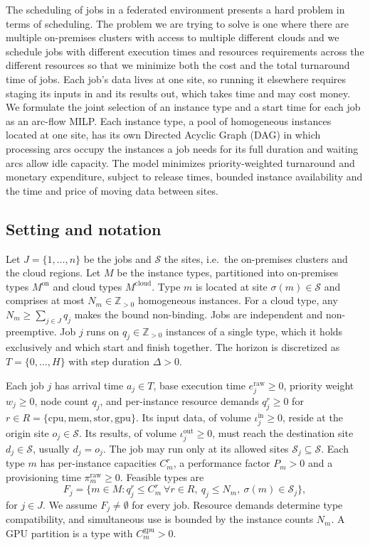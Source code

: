 \documentclass[conference]{IEEEtran}
\begin{document}
The scheduling of jobs in a federated environment presents a hard problem in terms of scheduling. The problem we are trying to solve is one where there are multiple on-premises clusters with access to multiple different clouds and we schedule jobs with different execution times and resources requirements  across the different resources so that we minimize both the cost and the total turnaround time of jobs. Each job's data lives at one site, so running it elsewhere requires staging its inputs in and its results out, which takes time and may cost money. We formulate the joint selection of an instance type and a start time for each job as an arc-flow MILP. Each instance type, a pool of homogeneous instances located at one site, has its own Directed Acyclic Graph (DAG) in which processing arcs occupy the instances a job needs for its full duration and waiting arcs allow idle capacity. The model minimizes priority-weighted turnaround and monetary expenditure, subject to release times, bounded instance availability and the time and price of moving data between sites.

\subsection{Setting and notation}

Let $J=\{1,\ldots,n\}$ be the jobs and $\mathcal{S}$ the sites, i.e.\ the on-premises clusters and the cloud regions. Let $M$ be the instance types, partitioned into on-premises types $M^{\mathrm{on}}$ and cloud types $M^{\mathrm{cloud}}$. Type $m$ is located at site $\sigma(m)\in\mathcal{S}$ and comprises at most $N_m\in\mathbb{Z}_{>0}$ homogeneous instances. For a cloud type, any $N_m\geq\sum_{j\in J}q_j$ makes the bound non-binding. Jobs are independent and non-preemptive. Job $j$ runs on $q_j\in\mathbb{Z}_{>0}$ instances of a single type, which it holds exclusively and which start and finish together. The horizon is discretized as $T=\{0,\ldots,H\}$ with step duration $\Delta>0$.

Each job $j$ has arrival time $a_j\in T$, base execution time $e_j^{\mathrm{raw}}\geq0$, priority weight $w_j\geq0$, node count $q_j$, and per-instance resource demands $q_j^r\geq0$ for $r\in R=\{\mathrm{cpu},\mathrm{mem},\mathrm{stor},\mathrm{gpu}\}$. Its input data, of volume $\iota_j^{\mathrm{in}}\geq0$, reside at the origin site $o_j\in\mathcal{S}$. Its results, of volume $\iota_j^{\mathrm{out}}\geq0$, must reach the destination site $d_j\in\mathcal{S}$, usually $d_j=o_j$. The job may run only at its allowed sites $\mathcal{S}_j\subseteq\mathcal{S}$. Each type $m$ has per-instance capacities $C_m^r$, a performance factor $P_m>0$ and a provisioning time $\pi_m^{\mathrm{raw}}\geq0$. Feasible types are
\begin{equation}
 F_j=\{m\in M:q_j^r\leq C_m^r\ \forall r\in R,\ q_j\leq N_m,\ \sigma(m)\in\mathcal{S}_j\},
\end{equation}
for $j\in J$. We assume $F_j\neq\emptyset$ for every job. Resource demands determine type compatibility, and simultaneous use is bounded by the instance counts $N_m$. A GPU partition is a type with $C_m^{\mathrm{gpu}}>0$.
\end{document}
